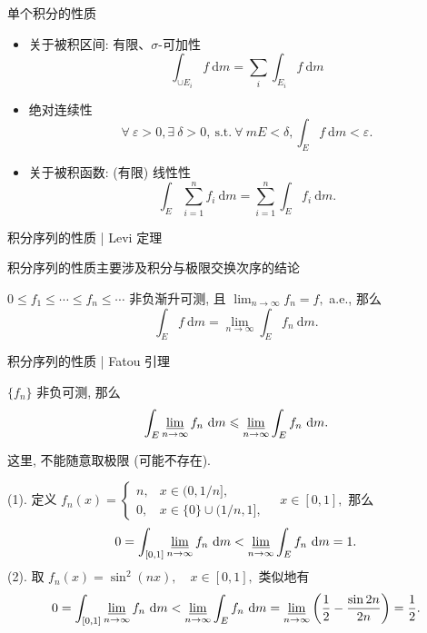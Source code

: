 
\begin{frame}{单个积分的性质}

\begin{itemize}
\item 关于被积区间: 有限、$\sigma$-可加性
\[
\int_{\cup E_i} f ~ \mathrm{d} m = \sum_i \int_{E_i} f ~ \mathrm{d} m
\]
\pause
\item 绝对连续性
\[
\forall ~ \varepsilon > 0, \exists ~ \delta > 0, ~ \text{s.t.} ~ \forall ~ m E < \delta, \int_{E} f ~ \mathrm{d} m < \varepsilon.
\]
\pause
\item 关于被积函数: (有限) 线性性
\[
\int_{E} \sum_{i=1}^n f_i ~ \mathrm{d} m = \sum_{i=1}^n \int_{E} f_i ~ \mathrm{d} m.
\]
\end{itemize}

\end{frame}


\begin{frame}{积分序列的性质 | {\smaller[1] Levi 定理}}

积分序列的性质主要涉及积分与极限交换次序的结论

\pause

\begin{thm}[Levi 定理]
$0 \leqslant f_1 \leqslant \cdots \leqslant f_n \leqslant \cdots$ 非负渐升可测, 且 $\displaystyle \lim_{n\to\infty} f_n = f,$ a.e., 那么
\[
\int_E f ~ \mathrm{d} m = \lim_{n\to\infty} \int_E f_n ~ \mathrm{d} m.
\]
\end{thm}

\end{frame}


\begin{frame}{积分序列的性质 | {\smaller[1] Fatou 引理}}

\begin{thm}[Fatou 引理]
$\{ f_n \}$ 非负可测, 那么
\[
\int_E \varliminf_{n\to\infty} f_n ~ \mathrm{d} m \leqslant \varliminf_{n\to\infty} \int_E f_n ~ \mathrm{d} m.
\]
\end{thm}
\alert{这里, 不能随意取极限 (可能不存在).}

\pause
\vspace{1em}

\begin{eg}
(1). 定义 $f_n(x) =
\begin{cases}
n, & x \in (0, 1/n], \\
0, & x \in \{0\} \cup (1/n, 1],
\end{cases}
\quad x \in [0,1],$ 那么
\[
0 = \int_{[0,1]} \varliminf_{n\to\infty} f_n ~ \mathrm{d} m < \varliminf_{n\to\infty} \int_E f_n ~ \mathrm{d} m = 1.
\]
\pause
(2). 取 $f_n(x) = \sin^2(n x), \quad x \in [0,1],$ 类似地有
\[
0 = \int_{[0,1]} \varliminf_{n\to\infty} f_n ~ \mathrm{d} m < \varliminf_{n\to\infty} \int_E f_n ~ \mathrm{d} m = \varliminf_{n\to\infty} \left( \frac{1}{2} - \frac{\sin 2n}{2n} \right) = \frac{1}{2}.
\]
\end{eg}

\end{frame}

